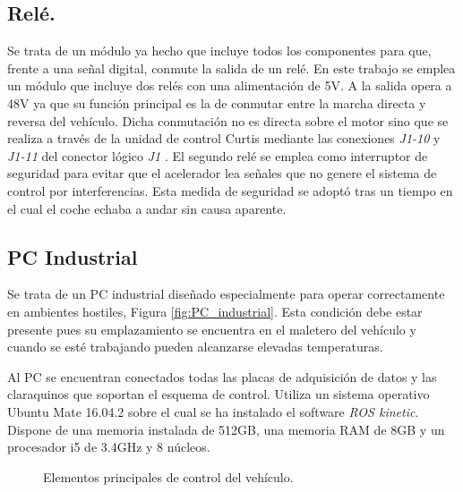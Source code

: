 \subsection{Relé.}
Se trata de un módulo ya hecho que incluye todos los componentes para que, frente a una señal digital, conmute la salida de un relé. En este trabajo se emplea un módulo que incluye dos relés con una alimentación de 5V. A la salida opera a 48V ya que su función principal es la de conmutar entre la marcha directa y reversa del vehículo. Dicha conmutación no es directa sobre el motor sino que se realiza a través de la unidad de control Curtis mediante las conexiones \textit{J1-10} y \textit{J1-11} del conector lógico \textit{J1} \cite{Controller2012}. El segundo relé se emplea como interruptor de seguridad para evitar que el acelerador lea señales que no genere el sistema de control por interferencias. Esta medida de seguridad se adoptó tras un tiempo en el cual el coche echaba a andar sin causa aparente. 

\subsection{PC Industrial}
Se trata de un PC industrial diseñado especialmente para operar correctamente en ambientes hostiles, Figura \ref{fig:PC_industrial}. Esta condición debe estar presente pues su emplazamiento se encuentra en el maletero del vehículo y cuando se esté trabajando pueden alcanzarse elevadas temperaturas.  

Al PC se encuentran conectados todas las placas de adquisición de datos y las claraquinos que soportan el esquema de control.  Utiliza un sistema operativo Ubuntu Mate 16.04.2 sobre el cual se ha instalado el software \textit{ROS kinetic}.  Dispone de una memoria instalada de 512GB, una memoria RAM de 8GB y un procesador i5 de 3.4GHz y 8 núcleos.

\begin{figure}[!ht]
	\centering
    \caption{Elementos principales de control del vehículo.}
\end{figure}

